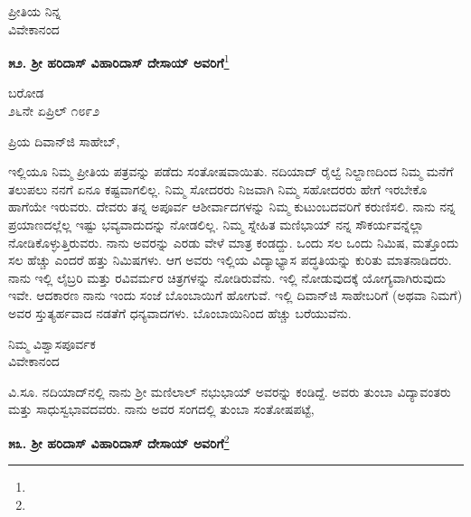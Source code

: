 {\flushright
ಪ್ರೀತಿಯ ನಿನ್ನ\\ವಿವೇಕಾನಂದ\par}

\begin{center}
\textbf{೫೨. ಶ‍್ರೀ ಹರಿದಾಸ್ ವಿಹಾರಿದಾಸ್ ದೇಸಾಯ್ ಅವರಿಗೆ}\footnote{}
\end{center}

\vspace{-0.65cm}

\begin{flushright}
ಬರೋಡ\\೨೬ನೇ ಏಪ್ರಿಲ್ ೧೮೯೨
\end{flushright}

\noindent
ಪ್ರಿಯ ದಿವಾನ್‌ಜಿ ಸಾಹೇಬ್,

ಇಲ್ಲಿಯೂ ನಿಮ್ಮ ಪ್ರೀತಿಯ ಪತ್ರವನ್ನು ಪಡೆದು ಸಂತೋಷವಾಯಿತು. ನದಿಯಾದ್ ರೈಲ್ವೆ ನಿಲ್ದಾಣದಿಂದ ನಿಮ್ಮ ಮನೆಗೆ ತಲುಪಲು ನನಗೆ ಏನೂ ಕಷ್ಟವಾಗಲಿಲ್ಲ. ನಿಮ್ಮ ಸೋದರರು ನಿಜವಾಗಿ ನಿಮ್ಮ ಸಹೋದರರು ಹೇಗೆ ಇರಬೇಕೊ ಹಾಗೆಯೇ ಇರುವರು. ದೇವರು ತನ್ನ ಅಪೂರ್ವ ಆಶೀರ್ವಾದಗಳನ್ನು ನಿಮ್ಮ ಕುಟುಂಬದವರಿಗೆ ಕರುಣಿಸಲಿ. ನಾನು ನನ್ನ ಪ್ರಯಾಣದಲ್ಲೆಲ್ಲ ಇಷ್ಟು ಭವ್ಯವಾದುದನ್ನು ನೋಡಲಿಲ್ಲ. ನಿಮ್ಮ ಸ್ನೇಹಿತ ಮಣಿಭಾಯ್ ನನ್ನ ಸೌಕರ್ಯವನ್ನೆಲ್ಲಾ ನೋಡಿಕೊಳ್ಳುತ್ತಿರುವರು. ನಾನು ಅವರನ್ನು ಎರಡು ವೇಳೆ ಮಾತ್ರ ಕಂಡದ್ದು. ಒಂದು ಸಲ ಒಂದು ನಿಮಿಷ, ಮತ್ತೊಂದು ಸಲ ಹೆಚ್ಚು ಎಂದರೆ ಹತ್ತು ನಿಮಿಷಗಳು. ಆಗ ಅವರು ಇಲ್ಲಿಯ ವಿದ್ಯಾಭ್ಯಾಸ ಪದ್ಧತಿಯನ್ನು ಕುರಿತು ಮಾತನಾಡಿದರು. ನಾನು ಇಲ್ಲಿ ಲೈಬ್ರರಿ ಮತ್ತು ರವಿವರ್ಮರ ಚಿತ್ರಗಳನ್ನು ನೋಡಿರುವೆನು. ಇಲ್ಲಿ ನೋಡುವುದಕ್ಕೆ ಯೋಗ್ಯವಾಗಿರುವುದು ಇವೇ. ಆದಕಾರಣ ನಾನು ಇಂದು ಸಂಜೆ ಬೊಂಬಾಯಿಗೆ ಹೋಗುವೆ. ಇಲ್ಲಿ ದಿವಾನ್‌ಜಿ ಸಾಹೇಬರಿಗೆ (ಅಥವಾ ನಿಮಗೆ) ಅವರ ಸ್ತುತ್ಯರ್ಹವಾದ ನಡತೆಗೆ ಧನ್ಯವಾದಗಳು. ಬೊಂಬಾಯಿನಿಂದ ಹೆಚ್ಚು ಬರೆಯುವೆನು.

\vspace{-0.55cm}

\begin{flushright}
ನಿಮ್ಮ ವಿಶ್ವಾಸಪೂರ್ವಕ\\ವಿವೇಕಾನಂದ
\end{flushright}

\vspace{-0.15cm}

ವಿ.ಸೂ. \enginline{-}ನದಿಯಾದ್‌ನಲ್ಲಿ ನಾನು ಶ‍್ರೀ ಮಣಿಲಾಲ್ ನಭುಭಾಯ್ ಅವರನ್ನು ಕಂಡಿದ್ದೆ. ಅವರು ತುಂಬಾ ವಿದ್ಯಾವಂತರು ಮತ್ತು ಸಾಧುಸ್ವಭಾವದವರು. ನಾನು ಅವರ ಸಂಗದಲ್ಲಿ ತುಂಬಾ ಸಂತೋಷಪಟ್ಟೆ,

\begin{center}
\textbf{೫೩. ಶ‍್ರೀ ಹರಿದಾಸ್ ವಿಹಾರಿದಾಸ್ ದೇಸಾಯ್ ಅವರಿಗೆ}\footnote{}
\end{center}

\vspace{-0.75cm}

\begin{flushright}
{\fontsize{11pt}{11pt}\selectfont{ಬೊಂಬಾಯಿ\\[-2pt] ೧೮೯೨}}
\end{flushright}

